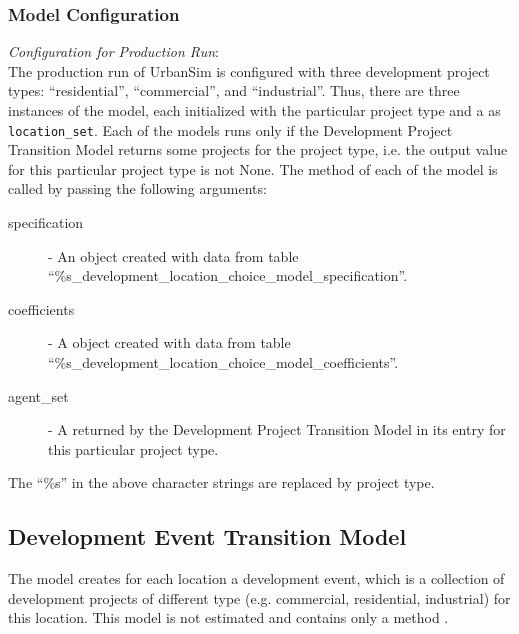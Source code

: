 \subsubsection{Model Configuration}
\modelsindex
%
{\em Configuration for Production Run}:\\[1mm]
The production run of UrbanSim is configured with three development project
types: ``residential'', ``commercial'', and ``industrial''. Thus, there are
three instances of the model, each initialized with the particular project
type and a  as \verb|location_set|.  Each of the models 
runs only if the Development Project Transition Model returns some projects
for the project type, i.e. the output value for this particular project type
is not None.  The  method of each of the model is called by
passing the following arguments:
\begin{description}
\item[specification] - An
 object created with data from table
``\%s_development_location_choice_model_specification''.  
\item[coefficients] - A  object created
with data from table ``\%s_development_location_choice_model_coefficients''.\modelsindex
\item[agent_set] - A  returned by the Development
  Project Transition Model in its entry for this particular project type.
\end{description}
The ``\%s'' in the above character strings are replaced by project type.

%
\subsection{Development Event Transition Model}
\modelsindex
%
\label{sec:development-event-transition-model}
%
The model creates for each location a development event, which is a collection
of development projects of different type (e.g. commercial, residential,
industrial) for this location. This model is not estimated and contains only a
method .

%
